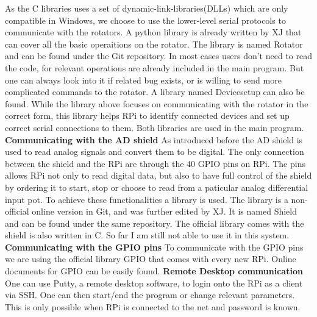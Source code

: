 \documentclass{article}
\begin{document}
As the C libraries uses a set of dynamic-link-libraries(DLLs) which are only compatible in Windows, we choose to use the lower-level serial protocols to communicate with the rotators. A python library is already written by XJ that can cover all the basic operaitions on the rotator. The library is named Rotator and can be found under the Git repository. In most cases users don't need to read the code, for relevant operations are already included in the main program. But one can always look into it if related bug exists, or is willing to send more complicated commands to the rotator.\newline
A library named Devicesetup can also be found. While the library above focuses on communicating with the rotator in the correct form, this library helps RPi to identify connected devices and set up correct serial connections to them. Both libraries are used in the main program.\newline\newline
\textbf{Communicating with the AD shield}\newline
As introduced before the AD shield is used to read analog signals and convert them to be digital. The only connection between the shield and the RPi are through the 40 GPIO pins on RPi. The pins allows RPi not only to read digital data, but also to have full control of the shield by ordering it to start, stop or choose to read from a paticular analog differential input pot. To achieve these functionalities a library is used. The library is a non-official online version in Git, and was further edited by XJ. It is named Shield and can be found under the same repository. \newline
The official library comes with the shield is also written in C. So far I am still not able to use it in this system. \newline\newline
\textbf{Communicating with the GPIO pins}\newline
To communicate with the GPIO pins we are using the official library GPIO that comes with every new RPi. Online documents for GPIO can be easily found.\newline\newline
\textbf{Remote Desktop communication}\newline
One can use Putty, a remote desktop software, to login onto the RPi as a client via SSH. One can then start/end the program or change relevant parameters. This is only possible when RPi is connected to the net and password is known. \newline\newline
\end{document}
